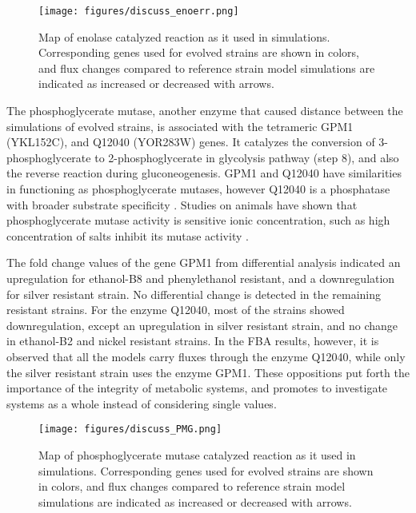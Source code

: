 \vspace{0.6cm}
\begin{figure}[H]
\texttt{[image: figures/discuss\_enoerr.png]}
\caption[Map of enolase catalyzed reaction as it used in simulations]{Map of enolase catalyzed reaction as it used in simulations. Corresponding genes used for evolved strains are shown in colors, and flux changes compared to reference strain model simulations are indicated as increased or decreased with arrows.}
\label{fig:discuss_ENOERR}
\end{figure}

\vspace{-0.5cm}

The phosphoglycerate mutase, another enzyme that caused distance between the simulations of evolved strains, is associated with the tetrameric GPM1 (YKL152C), and Q12040 (YOR283W) genes. It catalyzes the conversion of 3-phosphoglycerate to 2-phosphoglycerate in glycolysis pathway (step 8), and also the reverse reaction during gluconeogenesis. GPM1 and Q12040 have similarities in functioning as phosphoglycerate mutases, however Q12040 is a phosphatase with broader substrate specificity \cite{ho2009identification}. Studies on animals have shown that phosphoglycerate mutase activity is sensitive ionic concentration, such as high concentration of salts inhibit its mutase activity \cite{grisolia1967mercury}.

The fold change values of the gene GPM1 from differential analysis indicated an upregulation for ethanol-B8 and phenylethanol resistant, and a downregulation for silver resistant strain. No differential change is detected in the remaining resistant strains. For the enzyme Q12040, most of the strains showed downregulation, except an upregulation in silver resistant strain, and no change in ethanol-B2 and nickel resistant strains. In the FBA results, however, it is observed that all the models carry fluxes through the enzyme Q12040, while only the silver resistant strain uses the enzyme GPM1. These oppositions put forth the importance of the integrity of metabolic systems, and promotes to investigate systems as a whole instead of considering single values.

\vspace{0.5cm}
\begin{figure}[H]
\texttt{[image: figures/discuss\_PMG.png]}
\caption[Map of phosphoglycerate mutase catalyzed reaction as it used in simulations]{Map of phosphoglycerate mutase catalyzed reaction as it used in simulations. Corresponding genes used for evolved strains are shown in colors, and flux changes compared to reference strain model simulations are indicated as increased or decreased with arrows.}
\label{fig:discuss_PMG}
\end{figure}
\vspace{-0.5cm}

